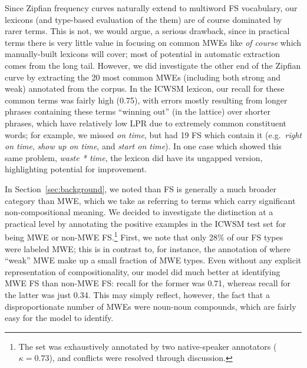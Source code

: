 \documentclass[11pt,letterpaper]{article}
\newcommand{\ex}[1]{\textit{#1}\xspace}
\newcommand{\secref}[2][]{Section#1~\ref{#2}\xspace}
\begin{document}
Since Zipfian frequency curves naturally extend to multiword FS vocabulary, our lexicons (and type-based evaluation of the them) are of course dominated by rarer terms. This is not, we would argue, a serious drawback, since in practical terms there is very little value in focusing on common MWEs like \ex{of course} which manually-built lexicons will cover; most of potential in automatic extraction comes from the long tail. However, we did investigate the other end of the Zipfian curve by extracting the 20 most common MWEs (including both strong and weak) annotated from the  corpus. In the ICWSM lexicon, our recall for these common terms was fairly high (0.75), with errors mostly resulting from longer phrases containing these terms ``winning out'' (in the lattice) over shorter phrases, which have relatively low LPR due to extremely common constituent words; for example, we missed \ex{on time}, but had 19 FS which contain it (e.g.\ \ex{right on time}, \ex{show up on time}, and \ex{start on time}). In one case which showed this same problem, \ex{waste * time}, the lexicon did have its ungapped version, highlighting potential for improvement. 



In \secref{sec:background}, we noted than FS is generally a much broader category than MWE, which we take as referring to terms which carry significant non-compositional meaning. We decided to investigate the distinction at a practical level by annotating the positive examples in the ICWSM test set for being MWE or non-MWE FS.\footnote{The set was exhaustively annotated by two native-speaker annotators ($\kappa = 0.73$), and conflicts were resolved through discussion.} First, we note that only 28\% of our FS types were labeled MWE; this is in contrast to, for instance, the annotation of  where ``weak'' MWE make up a small fraction of MWE types. Even without any explicit representation of compositionality, our model did much better at identifying MWE FS than non-MWE FS: recall for the former was 0.71, whereas recall for the latter was just 0.34. This may simply reflect, however, the fact that a disproportionate number of MWEs were noun-noun compounds, which are fairly easy for the model to identify.
\end{document}
